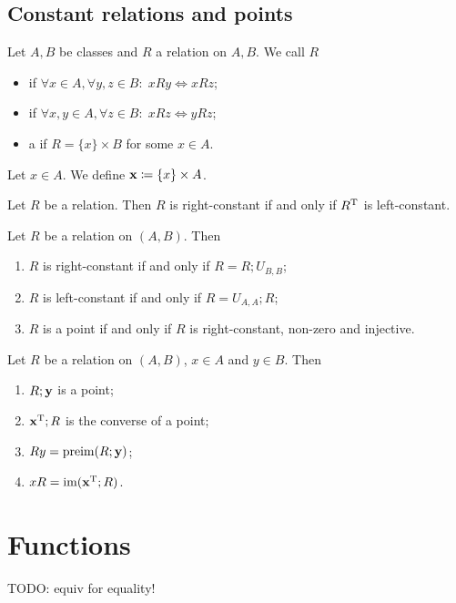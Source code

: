 \subsection{Constant relations and points}
\begin{definition}
Let $A,B$ be classes and $R$ a relation on $A,B$. We call $R$
\begin{itemize}
\item {} if $\forall x\in A, \forall y,z \in B: \; xRy \iff xRz$;
\item {} if $\forall x, y\in A, \forall z \in B: \; xRz \iff yRz$;
\item a  if $R = \{x\}\times B$ for some $x\in A$.
\end{itemize}
Let $x\in A$. We define $\point{x} \defeq \{x\}\times A$.
\end{definition}

\begin{lemma}
Let $R$ be a relation. Then $R$ is right-constant \textup{if and only if} $R^{\mathrm{T}}$ is left-constant.
\end{lemma}

\begin{lemma}
Let $R$ be a relation on $(A, B)$. Then
\begin{enumerate}
\item $R$ is right-constant \textup{if and only if} $R = R;U_{B,B}$;
\item $R$ is left-constant \textup{if and only if} $R = U_{A,A};R$;
\item $R$ is a point \textup{if and only if} $R$ is right-constant, non-zero and injective.
\end{enumerate}
\end{lemma}

\begin{lemma}
Let $R$ be a relation on $(A,B)$, $x\in A$ and $y\in B$. Then
\begin{enumerate}
\item $R;\point{y}$ is a point;
\item $\point{x}^\transp; R$ is the converse of a point;
\item $Ry = \preim(R;\point{y})$;
\item $xR = \im(\point{x}^\transp; R)$.
\end{enumerate}
\end{lemma}

\section{Functions}
TODO: equiv for equality!

